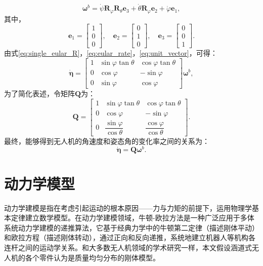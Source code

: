 \begin{equation}
\bm{\omega}^b = \dot{\psi} \bm{R}_\varphi \bm{R}_\theta \bm{e}_3 + \dot{\theta} \bm{R}_\varphi \bm{e}_2 + \dot{\varphi} \bm{e}_1,
\label{eq:eular_rate}
\end{equation}
其中，
\begin{equation}
\bm{e}_1 = 
\begin{bmatrix}
1 \\
0 \\
0
\end{bmatrix}, \quad \bm{e}_2 = 
\begin{bmatrix}
0 \\
1 \\
0
\end{bmatrix}, \quad \bm{e}_3 = 
\begin{bmatrix}
0 \\
0 \\
1
\end{bmatrix}.
\label{eq:unit_vector}
\end{equation}
由式\eqref{eq:single_eular_R}，\eqref{eq:eular_rate}，\eqref{eq:unit_vector}，可得：
\begin{equation}
\dot{\bm{\eta}} = 
\begin{bmatrix}
1 & \sin\varphi\tan\theta & \cos\varphi\tan\theta \\
0 & \cos\varphi & -\sin\varphi \\
0 & \sin\varphi & \cos\varphi
\end{bmatrix}
\bm{\omega}^b,
\end{equation}
为了简化表述，令矩阵$\bm{Q}$为：
\begin{equation}
\bm{Q} = 
\begin{bmatrix}
1 & \sin\varphi\tan\theta & \cos\varphi\tan\theta \\[6pt]
0 & \cos\varphi & -\sin\varphi \\[6pt]
0 & \dfrac{\sin\varphi}{\cos\theta} & \dfrac{\cos\varphi}{\cos\theta}
\end{bmatrix}.
\end{equation}
最终，能够得到无人机的角速度和姿态角的变化率之间的关系为：
\begin{equation}
    \dot{\bm{\eta}} = \bm{Q}\bm{\omega}^b.
    \label{eq:d_eular}
\end{equation}

\section{动力学模型}
动力学建模是指在考虑引起运动的根本原因——力与力矩的前提下，运用物理学基本定律建立数学模型。在动力学建模领域，牛顿-欧拉方法是一种广泛应用于多体系统动力学建模的递推算法，它基于经典力学中的牛顿第二定律（描述刚体平动）和欧拉方程（描述刚体转动），通过正向和反向递推，系统地建立机器人等机构各连杆之间的运动学关系。和大多数无人机领域的学术研究一样，本文假设涵道式无人机的各个零件认为是质量均匀分布的刚体模型。

